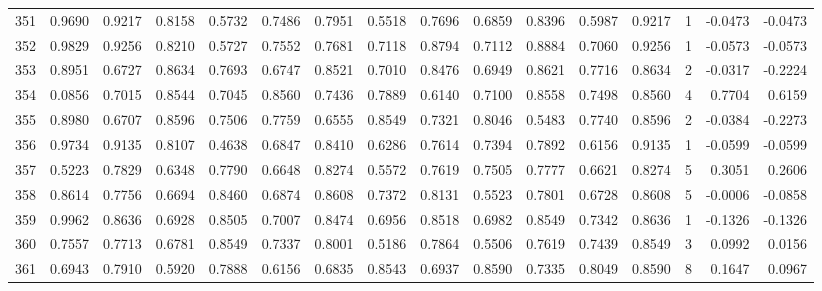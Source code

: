 \begin{tabular}{lrrrrrrrrrrrrrrr}
351 &      0.9690 &  0.9217 &  0.8158 &  0.5732 &  0.7486 &  0.7951 &  0.5518 &  0.7696 &  0.6859 &  0.8396 &   0.5987 &     0.9217 &      1 &                   -0.0473 &                    -0.0473 \\
352 &      0.9829 &  0.9256 &  0.8210 &  0.5727 &  0.7552 &  0.7681 &  0.7118 &  0.8794 &  0.7112 &  0.8884 &   0.7060 &     0.9256 &      1 &                   -0.0573 &                    -0.0573 \\
353 &      0.8951 &  0.6727 &  0.8634 &  0.7693 &  0.6747 &  0.8521 &  0.7010 &  0.8476 &  0.6949 &  0.8621 &   0.7716 &     0.8634 &      2 &                   -0.0317 &                    -0.2224 \\
354 &      0.0856 &  0.7015 &  0.8544 &  0.7045 &  0.8560 &  0.7436 &  0.7889 &  0.6140 &  0.7100 &  0.8558 &   0.7498 &     0.8560 &      4 &                    0.7704 &                     0.6159 \\
355 &      0.8980 &  0.6707 &  0.8596 &  0.7506 &  0.7759 &  0.6555 &  0.8549 &  0.7321 &  0.8046 &  0.5483 &   0.7740 &     0.8596 &      2 &                   -0.0384 &                    -0.2273 \\
356 &      0.9734 &  0.9135 &  0.8107 &  0.4638 &  0.6847 &  0.8410 &  0.6286 &  0.7614 &  0.7394 &  0.7892 &   0.6156 &     0.9135 &      1 &                   -0.0599 &                    -0.0599 \\
357 &      0.5223 &  0.7829 &  0.6348 &  0.7790 &  0.6648 &  0.8274 &  0.5572 &  0.7619 &  0.7505 &  0.7777 &   0.6621 &     0.8274 &      5 &                    0.3051 &                     0.2606 \\
358 &      0.8614 &  0.7756 &  0.6694 &  0.8460 &  0.6874 &  0.8608 &  0.7372 &  0.8131 &  0.5523 &  0.7801 &   0.6728 &     0.8608 &      5 &                   -0.0006 &                    -0.0858 \\
359 &      0.9962 &  0.8636 &  0.6928 &  0.8505 &  0.7007 &  0.8474 &  0.6956 &  0.8518 &  0.6982 &  0.8549 &   0.7342 &     0.8636 &      1 &                   -0.1326 &                    -0.1326 \\
360 &      0.7557 &  0.7713 &  0.6781 &  0.8549 &  0.7337 &  0.8001 &  0.5186 &  0.7864 &  0.5506 &  0.7619 &   0.7439 &     0.8549 &      3 &                    0.0992 &                     0.0156 \\
361 &      0.6943 &  0.7910 &  0.5920 &  0.7888 &  0.6156 &  0.6835 &  0.8543 &  0.6937 &  0.8590 &  0.7335 &   0.8049 &     0.8590 &      8 &                    0.1647 &                     0.0967 \\

\end{tabular}
